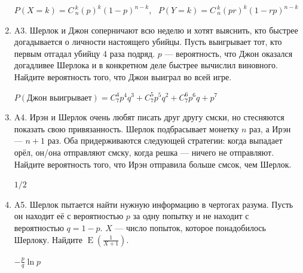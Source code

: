 \documentclass[12pt]{article}
\DeclareMathOperator{\E}{E}
\def \P{P}
\newenvironment{problem}{}{}
\newenvironment{sol}{}{} %
\begin{document}
\begin{enumerate}
\begin{problem}
\begin{sol}
$\P(X = k) = C^{\ k}_{\ n} (p)^k(1-p)^{n-k}$, \ $\P(Y = k) = C^{\ k}_{\ n}  (pr)^k(1-rp)^{n-k}$
\end{sol}
\end{problem}

\begin{problem}
\item[A3.]
Шерлок и Джон соперничают всю неделю и хотят выяснить, кто быстрее догадывается о личности настоящего убийцы. Пусть выигрывает тот, кто первым отгадал убийцу 4 раза подряд. $p$ — вероятность, что Джон оказался догадливее Шерлока и в конкретном деле быстрее вычислил виновного. Найдите вероятность того, что Джон выиграл во всей игре.

\begin{sol}
$\P(\text{Джон выигрывает}) = C^4_7p^4q^3 +C^5_7p^5q^2+C^6_7p^6q+p^7$ 
\end{sol}
\end{problem}

\begin{problem}
\item[A4.]
Ирэн и Шерлок очень любят писать друг другу смски, но стесняются показать свою привязанность. Шерлок подбрасывает монетку $n$ раз, а Ирэн — $n + 1$ раз. Оба придерживаются следующей стратегии: когда выпадает орёл, он/она отправляют смску, когда решка — ничего не отправляют. Найдите вероятность того, что Ирэн отправила больше смсок, чем Шерлок.

\begin{sol}
$1/2$
\end{sol}
\end{problem}

\begin{problem}
\item[A5.]
Шерлок пытается найти нужную информацию в чертогах разума. Пусть он находит её с вероятностью $p$ за одну попытку и не находит с вероятностью $q=1 -p$. $X$ — число попыток, которое понадобилось Шерлоку. Найдите $\E\left(\frac{1}{X+1} \right)$.

\begin{sol}
$- \frac{p}{q} \ln p$
\end{sol}
\end{problem}




\end{enumerate}
\end{document}
